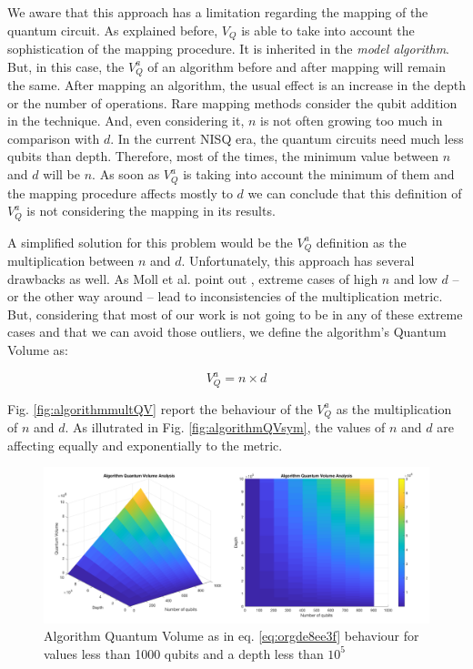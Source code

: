 \begin{enumerate}
\begin{enumerate}
\begin{enumerate}
We aware that this approach has a limitation regarding the mapping of the quantum circuit.
As explained before, \(V_Q\) is able to take into account the sophistication of the mapping procedure.
It is inherited in the \emph{model algorithm}.
But, in this case, the \(V^a_Q\) of an algorithm before and after mapping will remain the same.
After mapping an algorithm, the usual effect is an increase in the depth or the number of operations.
Rare mapping methods consider the qubit addition in the technique.
And, even considering it, \(n\) is not often growing too much in comparison with \(d\).
In the current NISQ era, the quantum circuits need much less qubits than depth.
Therefore, most of the times, the minimum value between \(n\) and \(d\) will be \(n\).
As soon as \(V^a_Q\) is taking into account the minimum of them and the mapping procedure affects mostly to \(d\) we can conclude that this definition of \(V^a_Q\) is not considering the mapping in its results.

A simplified solution for this problem would be the \(V^a_Q\) definition as the multiplication between \(n\) and \(d\).
Unfortunately, this approach has several drawbacks as well.
As Moll et al. point out \cite{Moll_2018}, extreme cases of high \(n\) and low \(d\) -- or the other way around -- lead to inconsistencies of the multiplication metric.
But, considering that most of our work is not going to be in any of these extreme cases and that we can avoid those outliers, we define the algorithm's Quantum Volume as:

\begin{equation}
\label{eq:orgde8ee3f}
V_Q^a =  n \times d
\end{equation}

Fig. \ref{fig:algorithmmultQV} report the behaviour of the \(V_Q^a\) as
the multiplication of \(n\) and \(d\).
As illutrated in Fig. \ref{fig:algorithmQVsym}, the values of \(n\) and \(d\) are
affecting equally and exponentially to the metric.

\begin{figure}[htbp]
\centering
\includegraphics[width=\textwidth]{figures/V_q_analysis_mult.png}
\caption{\label{fig:org8d98466}
Algorithm Quantum Volume as in eq. \ref{eq:orgde8ee3f} behaviour for values less than 1000 qubits and a depth less than \(10^{5}\)}
\end{figure}


\end{enumerate}
\end{enumerate}
\end{enumerate}
